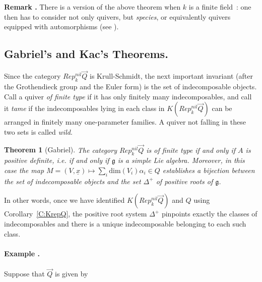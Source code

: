 \documentclass[a4paper,10pt]{amsart}
\def\a{\alpha}
\def\g{\mathfrak{g}}
\newtheorem{theo}{\bf{Theorem}}[section]
\numberwithin{equation}{section}
\begin{document}
\addtocounter{theo}{1}
\noindent \textbf{Remark \thetheo .} There is a version of the above theorem when $k$ is a finite field~: one then has to consider not only quivers, but \textit{species}, or equivalently quivers equipped with automorphisms (see \cite{RingelTame}).

\vspace{.2in}

\subsection{Gabriel's and Kac's Theorems.}

\vspace{.15in}

Since the category $Rep^{nil}_k\vec{Q}$ is Krull-Schmidt, the next important invariant (after the Grothendieck group and the Euler form) is the set of indecomposable objects. Call a quiver \textit{of finite type} if it has only finitely many indecomposables, and call it \textit{tame} if the indecomposables lying in each class in $K(Rep^{nil}_k\vec{Q})$ can be arranged in finitely many one-parameter families. A quiver not falling in these two sets is called \textit{wild}.

\vspace{.1in}

\begin{theo}[Gabriel] The category $Rep^{nil}_k\vec{Q}$ is of finite type if and only if $A$ is positive definite, i.e. if and only if $\g$ is a simple Lie algebra. Moreover, in this case the map $M=(V,\underline{x}) \mapsto \sum_i \text{dim}(V_i) \a_i \in Q$ establishes a bijection between the set of indecomposable objects and the set $\Delta^+$ of positive roots of $\g$.\end{theo}

\vspace{.1in}

In other words, once we have identified $K(Rep^{nil}_k\vec{Q})$ and $Q$ using Corollary~\ref{C:KrepQ}, the positive root system $\Delta^+$ pinpoints exactly the classes of indecomposables and there is a unique indecomposable belonging to each such class.

\vspace{.15in}

\addtocounter{theo}{1}

\paragraph{\textbf{Example \thetheo.}} Suppose that $\vec{Q}$ is given by
\end{document}

